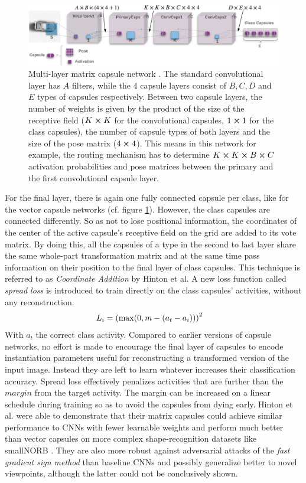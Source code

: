 \begin{figure}[H]
    \centering
    \includegraphics[width=\textwidth]{figures/matrix-capsules.png}
\caption[Multi-layer matrix capsule network]{Multi-layer matrix capsule network \cite{hinton2018matrix}. The standard convolutional layer has $A$ filters, while the 4 capsule layers consist of $B,C,D$ and $E$ types of capsules respectively. Between two capsule layers, the number of weights is given by the product of the size of the receptive field ($K\cross K$ for the convolutional capsules, $1\cross 1$ for the class capsules), the number of capsule types of both layers and the size of the pose matrix ($4\cross 4$). This means in this network for example, the routing mechanism has to determine $K\cross K\cross B\cross C$ activation probabilities and pose matrices between the primary and the first convolutional capsule layer.}\label{fig:matrix-capsules}
\end{figure}\noindent
For the final layer, there is again one fully connected capsule per class, like for the vector capsule networks (cf. figure \ref{fig:matrix-capsules}). However, the class capsules are connected differently. So as not to lose positional information, the coordinates of the center of the active capsule's receptive field on the grid are added to its vote matrix. By doing this, all the capsules of a type in the second to last layer share the same whole-part transformation matrix and at the same time pass information on their position to the final layer of class capsules. This technique is referred to as \emph{Coordinate Addition} by Hinton et al.
A new loss function called \emph{spread loss} is introduced to train directly on the class capsules' activities, without any reconstruction.
\begin{align}\label{eq:spread-loss}
    L_i &= \qty(\max(0,m-\qty(a_t-a_i)))^2
\end{align}
With $a_t$ the correct class activity. Compared to earlier versions of capsule networks, no effort is made to encourage the final layer of capsules to encode instantiation parameters useful for reconstructing a transformed version of the input image. Instead they are left to learn whatever increases their classification accuracy. Spread loss effectively penalizes activities that are further than the $margin$ from the target activity. The margin can be increased on a linear schedule during training so as to avoid the capsules from dying early. Hinton et al. were able to demonstrate that their matrix capsules could achieve similar performance to CNNs with fewer learnable weights and perform much better than vector capsules on more complex shape-recognition datasets like smallNORB \cite{lecun2004learning}. They are also more robust against adversarial attacks of the \emph{fast gradient sign method} than baseline CNNs and possibly generalize better to novel viewpoints, although the latter could not be conclusively shown.